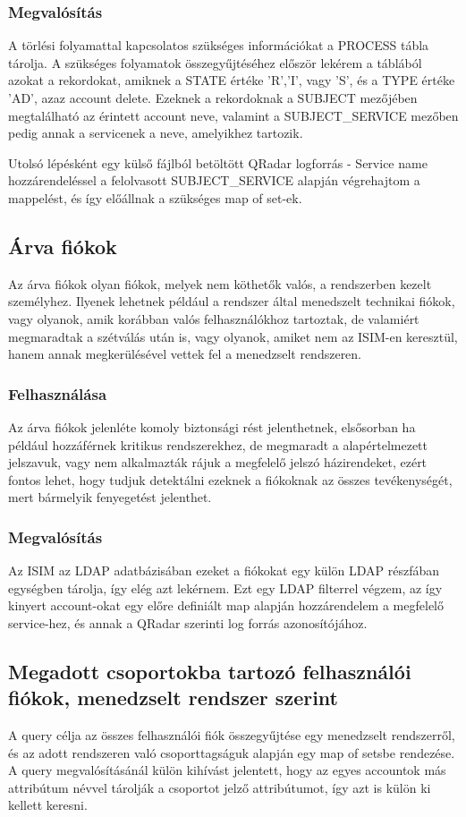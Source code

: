	\subsubsection{Megvalósítás}
		A törlési folyamattal kapcsolatos szükséges információkat a PROCESS tábla tárolja. A szükséges folyamatok összegyűjtéséhez először lekérem a  táblából azokat a rekordokat, amiknek a STATE értéke 'R','I', vagy 'S', és a TYPE értéke 'AD', azaz account delete. Ezeknek a rekordoknak a SUBJECT mezőjében megtalálható az érintett account neve, valamint a SUBJECT\_SERVICE mezőben pedig annak a servicenek a neve, amelyikhez tartozik.
		
		Utolsó lépésként egy külső fájlból betöltött QRadar logforrás - Service name hozzárendeléssel a felolvasott SUBJECT\_SERVICE alapján végrehajtom a mappelést, és így előállnak a szükséges map of set-ek.
	
\subsection{Árva fiókok } \label{lbl:orphanaccs}
Az árva fiókok olyan fiókok, melyek nem köthetők valós, a rendszerben kezelt személyhez. Ilyenek lehetnek például a rendszer által menedszelt technikai fiókok, vagy olyanok, amik korábban valós felhasználókhoz tartoztak, de valamiért megmaradtak a szétválás után is, vagy olyanok, amiket nem az ISIM-en keresztül, hanem annak megkerülésével vettek fel a menedzselt rendszeren. 
	\subsubsection{Felhasználása}
 	Az árva fiókok jelenléte komoly biztonsági rést jelenthetnek, elsősorban ha például hozzáférnek kritikus rendszerekhez, de megmaradt a alapértelmezett jelszavuk, vagy nem alkalmazták rájuk a megfelelő jelszó házirendeket, ezért fontos lehet, hogy tudjuk detektálni ezeknek a fiókoknak az összes tevékenységét, mert bármelyik fenyegetést jelenthet.
	\subsubsection{Megvalósítás}
	Az ISIM az LDAP adatbázisában ezeket a fiókokat egy külön LDAP részfában egységben tárolja, így elég azt lekérnem. Ezt egy LDAP filterrel végzem, az így kinyert account-okat egy előre definiált map alapján hozzárendelem a megfelelő service-hez, és annak a QRadar szerinti log forrás azonosítójához.
	
\subsection{Megadott csoportokba tartozó felhasználói fiókok, menedzselt rendszer szerint}		
A query célja az összes felhasználói fiók összegyűjtése egy menedzselt rendszerről, és az adott rendszeren való csoporttagságuk alapján egy map of setsbe rendezése. A query megvalósításánál külön kihívást jelentett, hogy az egyes accountok más attribútum névvel tárolják a csoportot jelző attribútumot, így azt is külön ki kellett keresni.
